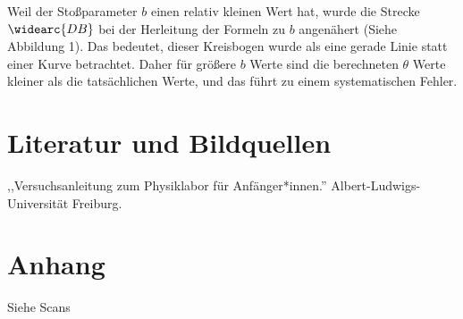 \documentclass[11pt,a4paper]{article}
\begin{document}
Weil der Stoßparameter $b$ einen relativ kleinen Wert hat, wurde die Strecke $\widearc{DB}$ bei der Herleitung der Formeln zu $b$ angenähert (Siehe Abbildung 1). Das bedeutet, dieser Kreisbogen wurde als eine gerade Linie statt einer Kurve betrachtet. Daher für größere $b$ Werte sind die berechneten $\theta$ Werte kleiner als die tatsächlichen Werte, und das führt zu einem systematischen Fehler. 

\section{Literatur und Bildquellen}
,,Versuchsanleitung zum Physiklabor für Anfänger*innen.'' Albert-Ludwigs-Universität Freiburg. 
\section{Anhang}
Siehe Scans
\end{document}
